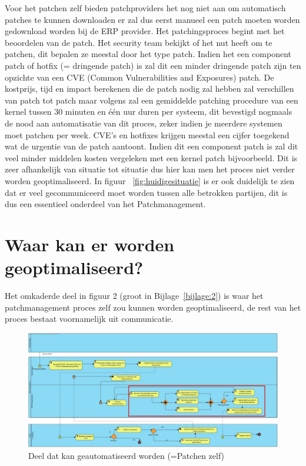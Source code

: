 Voor het patchen zelf bieden patchproviders het nog niet aan om automatisch patches te kunnen downloaden er zal dus eerst manueel een patch moeten worden gedownload worden bij de ERP provider. Het patchingsproces begint met het beoordelen van de patch. Het security team bekijkt of het nut heeft
om te patchen, dit bepalen ze meestal door het type patch. Indien het een component patch of hotfix (= dringende patch) is zal dit een minder dringende patch zijn ten opzichte van een CVE (Common Vulnerabilities and Exposures) patch. De kostprijs, tijd en impact berekenen
die de patch nodig zal hebben zal verschillen van patch tot patch maar volgens \textcite{Heyndrickx2024} zal een gemiddelde patching procedure van een kernel tussen 30 minuten en één uur duren per systeem, dit bevestigd nogmaals de nood aan
automatisatie van dit proces, zeker indien je meerdere systemen moet patchen per week. CVE's en hotfixes krijgen meestal een cijfer toegekend wat de urgentie van de patch aantoont. Indien dit een component patch is zal dit veel minder middelen kosten vergeleken
met een kernel patch bijvoorbeeld. Dit is zeer afhankelijk van situatie tot situatie dus hier kan men het proces niet verder worden geoptimaliseerd. In figuur ~\ref{fig:huidigesituatie} is er ook duidelijk te zien dat er veel gecommuniceerd moet worden tussen alle betrokken partijen, dit is dus een essentieel onderdeel van het Patchmanagement. \\


\section{Waar kan er worden geoptimaliseerd?}

Het omkaderde deel in figuur 2 (groot in Bijlage~\ref{bijlage:2}) is waar het patchmanagement proces zelf zou kunnen worden geoptimaliseerd, de rest van het proces bestaat voornamelijk uit communicatie.
 \begin{figure}[h]
    \centering
    \includegraphics[width=\textwidth]{huidigesituatie2.jpg}
    \caption{Deel dat kan geautomatiseerd worden (=Patchen zelf)}
     \label{fig:huidigesituatie2}
\end{figure}
\newpage


